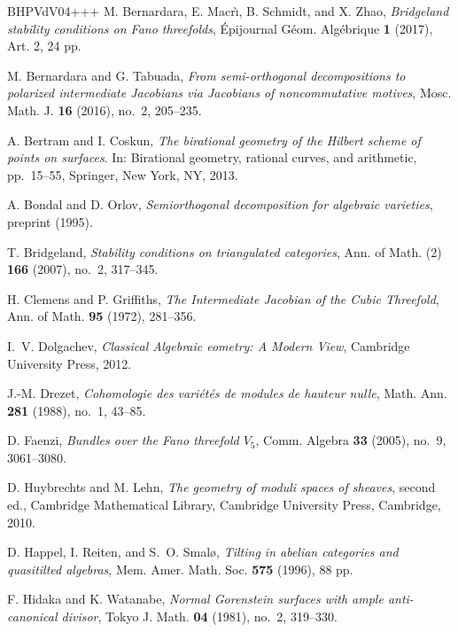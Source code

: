 \documentclass[11pt]{amsart}
\theoremstyle{definition}
\begin{document}
\begin{thebibliography}{BHPVdV04+++}
M. Bernardara, E. Macr\`\i, B. Schmidt, and X. Zhao,
  \emph{Bridgeland stability conditions on {F}ano threefolds}, \'{E}pijournal
  G\'{e}om. Alg\'{e}brique \textbf{1} (2017), Art. 2, 24 pp.
 
M. Bernardara and G. Tabuada, \emph{From semi-orthogonal
  decompositions to polarized intermediate {J}acobians via {J}acobians of
  noncommutative motives}, Mosc. Math. J. \textbf{16} (2016), no.~2, 205--235.

A. Bertram and I. Coskun, \emph{The birational geometry of the {H}ilbert
  scheme of points on surfaces}. In: Birational geometry, rational curves, and
  arithmetic, pp.~15--55, Springer, New York, NY, 2013.

A. Bondal and D. Orlov, \emph{Semiorthogonal decomposition for algebraic
  varieties}, preprint  (1995).

T. Bridgeland, \emph{Stability conditions on triangulated categories}, Ann. of
  Math. (2) \textbf{166} (2007), no.~2, 317--345.

H. Clemens and P. Griffiths, \emph{The {I}ntermediate {J}acobian of the {C}ubic
  {T}hreefold}, Ann. of Math. \textbf{95} (1972), 281--356.

I.~V. Dolgachev, \emph{Classical {A}lgebraic {}eometry: {A} {M}odern {V}iew},
  Cambridge {U}niversity {P}ress, 2012.

J.-M. Drezet, \emph{Cohomologie des vari\'{e}t\'{e}s de modules de hauteur
  nulle}, Math. Ann. \textbf{281} (1988), no.~1, 43--85.

D. Faenzi, \emph{Bundles over the {F}ano threefold {$V_5$}}, Comm. Algebra
  \textbf{33} (2005), no.~9, 3061--3080.

D. Huybrechts and M. Lehn, \emph{The geometry of moduli spaces of sheaves},
  second ed., Cambridge Mathematical Library, Cambridge University Press,
  Cambridge, 2010.

D. Happel, I. Reiten, and S.~O. Smal{\o}, \emph{Tilting in abelian categories
  and quasitilted algebras}, Mem. Amer. Math. Soc. \textbf{575} (1996),
88 pp.

F. Hidaka and K. Watanabe, \emph{Normal {G}orenstein surfaces with ample
  anti-canonical divisor}, Tokyo J. Math. \textbf{04} (1981), no.~2, 319--330.


\end{thebibliography}
\end{document}
